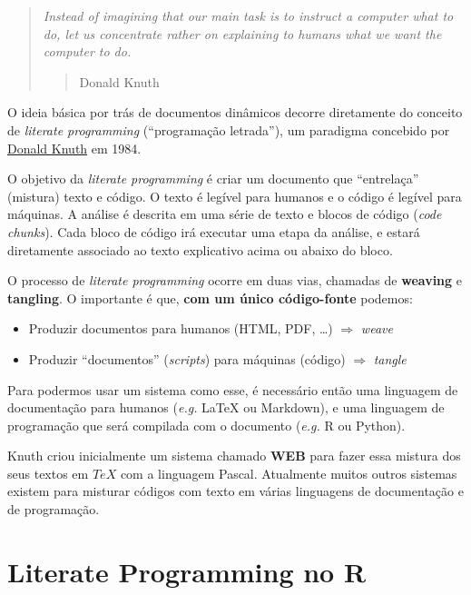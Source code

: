 \documentclass[
  10pt,
  a4paper]{book}
\providecommand{\tightlist}{%
  \setlength{\itemsep}{0pt}\setlength{\parskip}{0pt}}
\begin{document}
\begin{quote}
\emph{Instead of imagining that our main task is to instruct a computer what
to do, let us concentrate rather on explaining to humans what we want
the computer to do.}

\begin{quote}
Donald Knuth
\end{quote}
\end{quote}

O ideia básica por trás de documentos dinâmicos decorre diretamente do
conceito de \emph{literate programming} (``programação letrada''), um paradigma
concebido por \href{https://en.wikipedia.org/wiki/Donald_Knuth}{Donald Knuth} em 1984.

O objetivo da \emph{literate programming} é criar um documento que
``entrelaça'' (mistura) texto e código. O texto é legível para humanos e o
código é legível para máquinas. A análise é descrita em uma série de
texto e blocos de código (\emph{code chunks}). Cada bloco de código irá
executar uma etapa da análise, e estará diretamente associado ao texto
explicativo acima ou abaixo do bloco.

O processo de \emph{literate programming} ocorre em duas vias, chamadas de
\textbf{weaving} e \textbf{tangling}. O importante é que, \textbf{com um único
código-fonte} podemos:

\begin{itemize}
\tightlist
\item
  Produzir documentos para humanos (HTML, PDF, \ldots) \(\Rightarrow\) \emph{weave}
\item
  Produzir ``documentos'' (\emph{scripts}) para máquinas (código) \(\Rightarrow\)
  \emph{tangle}
\end{itemize}

Para podermos usar um sistema como esse, é necessário então uma
linguagem de documentação para humanos (\emph{e.g.} LaTeX ou Markdown), e
uma linguagem de programação que será compilada com o documento (\emph{e.g.}
R ou Python).

Knuth criou inicialmente um sistema chamado \textbf{WEB} para fazer essa
mistura dos seus textos em \(TeX\) com a linguagem Pascal. Atualmente
muitos outros sistemas existem para misturar códigos com texto em várias
linguagens de documentação e de programação.

\hypertarget{literate-programming-no-r}{%
\section{Literate Programming no R}\label{literate-programming-no-r}}
\end{document}

